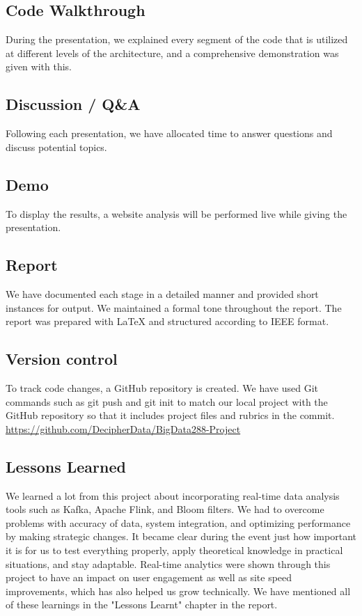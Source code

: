 \documentclass[conference]{IEEEtran}
\begin{document}
\subsection{Code Walkthrough}
During the presentation, we explained every segment of the code that is utilized at different levels of the architecture, and a comprehensive demonstration was given with this.
\subsection{Discussion / Q\&A}
Following each presentation, we have allocated time to answer questions and discuss potential topics.
\subsection{Demo}
To display the results, a website analysis will be performed live while giving the presentation.
\subsection{Report}
We have documented each stage in a detailed manner and provided short instances for output. We maintained a formal tone throughout the report. The report was prepared with LaTeX and structured according to IEEE format.
\subsection{Version control}
To track code changes, a GitHub repository is created. We have used Git commands such as git push and git init to match our local project with the GitHub repository so that it includes project files and rubrics in the commit.
\url{https://github.com/DecipherData/BigData288-Project}
\subsection{Lessons Learned}
We learned a lot from this project about incorporating real-time data analysis tools such as Kafka, Apache Flink, and Bloom filters. We had to overcome problems with accuracy of data, system integration, and optimizing performance by making strategic changes. It became clear during the event just how important it is for us to test everything properly, apply theoretical knowledge in practical situations, and stay adaptable. Real-time analytics were shown through this project to have an impact on user engagement as well as site speed improvements, which has also helped us grow technically. We have mentioned all of these learnings in the "Lessons Learnt" chapter in the report.
\end{document}
